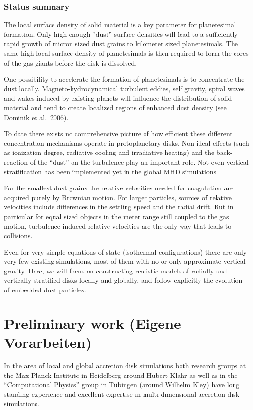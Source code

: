 \subsubsection{Status summary}
%
The local surface density of solid material is a key parameter for
planetesimal formation. Only high enough ``dust'' surface densities will
lead to a sufficiently rapid growth of micron sized dust grains to kilometer
sized planetesimals. The same high local surface density of planetesimals is
then required to form the cores of the gas giants before the disk is
dissolved.

One possibility to accelerate the formation of planetesimals is to
concentrate the dust locally. Magneto-hydrodynamical turbulent eddies, self
gravity, spiral waves and wakes induced by existing planets will influence
the distribution of solid material and tend to create localized regions of
enhanced dust density (see Dominik et al.\ 2006).

To date there exists no comprehensive picture of how efficient these
different concentration mechanisms operate in protoplanetary disks.
Non-ideal effects (such as ionization degree, radiative cooling and
irradiative heating) and the back-reaction of the ``dust'' on the turbulence
play an important role. Not even vertical stratification has been
implemented yet in the global MHD simulations.

For the smallest dust grains the relative velocities needed for coagulation
are acquired purely by Brownian motion. For larger particles, sources of
relative velocities include differences in the settling speed and the radial
drift. But in particular for equal sized objects in the meter range still
coupled to the gas motion, turbulence induced relative velocities are the
only way that leads to collisions.

Even for very simple equations of state (isothermal configurations) there
are only very few existing simulations, most of them with no or only
approximate vertical gravity.  Here, we will focus on constructing realistic
models of radially and vertically stratified disks locally and globally, and
follow explicitly the evolution of embedded dust particles.
%
\section{Preliminary work (Eigene Vorarbeiten)}
%
In the area of local and global accretion disk simulations both research
groups at the Max-Planck Institute in Heidelberg around Hubert Klahr as well
as in the ``Computational Physics'' group in T\"ubingen (around Wilhelm
Kley) have long standing experience and excellent expertise in
multi-dimensional accretion disk simulations.
%
